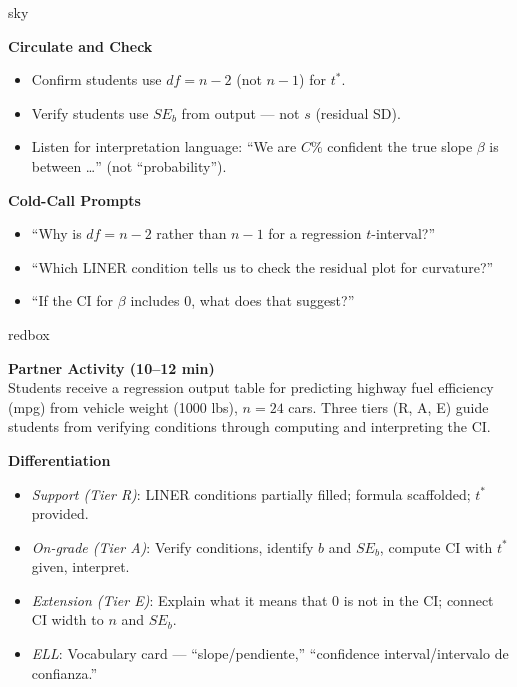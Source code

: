 \documentclass[10pt]{article}
\begin{document}
\begin{skillbox}{sky}
\begin{minipage}[t]{0.48\linewidth}
    \textbf{Circulate and Check}
    \begin{itemize}
        \item Confirm students use $df = n - 2$ (not $n - 1$) for $t^*$.
        \item Verify students use $SE_b$ from output --- not $s$ (residual SD).
        \item Listen for interpretation language: ``We are $C$\% confident the true slope
              $\beta$ is between \ldots'' (not ``probability'').
    \end{itemize}
\end{minipage}
\hfill
\begin{minipage}[t]{0.48\linewidth}
    \textbf{Cold-Call Prompts}
    \begin{itemize}
        \item ``Why is $df = n - 2$ rather than $n - 1$ for a regression $t$-interval?''
        \item ``Which LINER condition tells us to check the residual plot for curvature?''
        \item ``If the CI for $\beta$ includes 0, what does that suggest?''
    \end{itemize}
\end{minipage}
\end{skillbox}

\begin{skillbox}{redbox}
\begin{minipage}[t]{0.48\linewidth}
    \textbf{Partner Activity (10--12 min)}\\
    Students receive a regression output table for predicting highway fuel efficiency
    (mpg) from vehicle weight (1000 lbs), $n = 24$ cars. Three tiers (R, A, E) guide
    students from verifying conditions through computing and interpreting the CI.
\end{minipage}
\hfill
\begin{minipage}[t]{0.48\linewidth}
    \textbf{Differentiation}
    \begin{itemize}
        \item \textit{Support (Tier R)}: LINER conditions partially filled; formula
              scaffolded; $t^*$ provided.
        \item \textit{On-grade (Tier A)}: Verify conditions, identify $b$ and $SE_b$,
              compute CI with $t^*$ given, interpret.
        \item \textit{Extension (Tier E)}: Explain what it means that 0 is not in the CI;
              connect CI width to $n$ and $SE_b$.
        \item \textit{ELL}: Vocabulary card --- ``slope/pendiente,''
              ``confidence interval/intervalo de confianza.''
    \end{itemize}
\end{minipage}
\end{skillbox}
\end{document}
